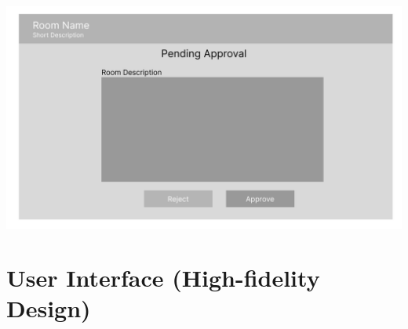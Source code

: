 \documentclass[12pt,titlepage,a4paper]{report}
\begin{document}
\begin{center}
        \includegraphics[width=\textwidth]{images/figures/UIUX/Pending_Approval_(Dosenk) 1.png}\\
    \end{center}
    \newpage
    \section{User Interface (High-fidelity Design)}
\end{document}
